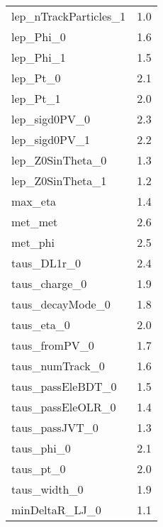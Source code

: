 \begin{longtable}{ll}
    lep\_nTrackParticles\_1      & 1.0                          \\
    lep\_Phi\_0                  & 1.6                          \\
    lep\_Phi\_1                  & 1.5                          \\
    lep\_Pt\_0                   & 2.1                          \\
    lep\_Pt\_1                   & 2.0                          \\
    lep\_sigd0PV\_0              & 2.3                          \\
    lep\_sigd0PV\_1              & 2.2                          \\
    lep\_Z0SinTheta\_0           & 1.3                          \\
    lep\_Z0SinTheta\_1           & 1.2                          \\
    max\_eta                     & 1.4                          \\
    met\_met                     & 2.6                          \\
    met\_phi                     & 2.5                          \\
    taus\_DL1r\_0                & 2.4                          \\
    taus\_charge\_0              & 1.9                          \\
    taus\_decayMode\_0           & 1.8                          \\
    taus\_eta\_0                 & 2.0                          \\
    taus\_fromPV\_0              & 1.7                          \\
    taus\_numTrack\_0            & 1.6                          \\
    taus\_passEleBDT\_0          & 1.5                          \\
    taus\_passEleOLR\_0          & 1.4                          \\
    taus\_passJVT\_0             & 1.3                          \\
    taus\_phi\_0                 & 2.1                          \\
    taus\_pt\_0                  & 2.0                          \\
    taus\_width\_0               & 1.9                          \\
    minDeltaR\_LJ\_0             & 1.1                          \\

\end{longtable}
